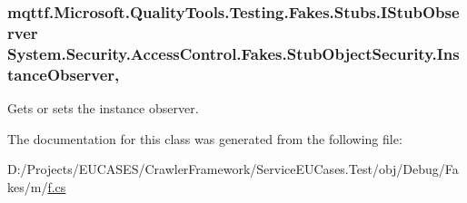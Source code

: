 \hypertarget{class_system_1_1_security_1_1_access_control_1_1_fakes_1_1_stub_object_security_a734fba1ef295f688bb51f89d88013f48}{
\subsubsection[{Instance\-Observer}]{\setlength{\rightskip}{0pt plus 5cm}mqttf.\-Microsoft.\-Quality\-Tools.\-Testing.\-Fakes.\-Stubs.\-I\-Stub\-Observer System.\-Security.\-Access\-Control.\-Fakes.\-Stub\-Object\-Security.\-Instance\-Observer\hspace{0.3cm}{\ttfamily [get]}, {\ttfamily [set]}}}\label{class_system_1_1_security_1_1_access_control_1_1_fakes_1_1_stub_object_security_a734fba1ef295f688bb51f89d88013f48}


Gets or sets the instance observer.



The documentation for this class was generated from the following file\-:\begin{DoxyCompactItemize}
\item 
D\-:/\-Projects/\-E\-U\-C\-A\-S\-E\-S/\-Crawler\-Framework/\-Service\-E\-U\-Cases.\-Test/obj/\-Debug/\-Fakes/m/\hyperlink{m_2f_8cs}{f.\-cs}\end{DoxyCompactItemize}
